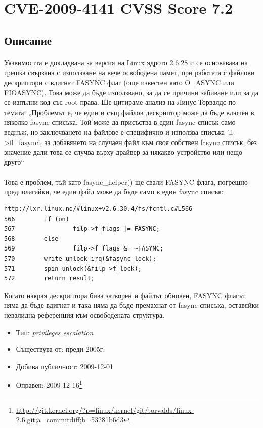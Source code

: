 \documentclass[a4paper,12pt,leqno]{article}
\begin{document}
\section{CVE-2009-4141 CVSS Score 7.2}
\subsection{Описание}
\paragraph{}
Уязвимостта е докладвана за версия на Linux ядрото 2.6.28 и се основавава на 
грешка свързана с  използване на вече освободена памет, при работата с 
файлови дескриптори с вдигнат FASYNC флаг (още известен като O\_ASYNC или 
FIOASYNC). Това може да бъде използвано, за да се причини забиване или за 
да се изпълни код със root права. Ще цитираме анализ на Линус Торвалдс по 
темата: „Проблемът е, че един и същ файлов дескриптор може да бъде 
влючен в няколко fasync списъка. Той може да присъства в един fasync списък 
само веднъж, но заключването на файлове е специфично и използва списъка 
'fl->fl\_fasync', за добавянето на случаен файл към своя собствен fasync списък, 
без значение дали това се случва върху драйвер за някакво устройство или 
нещо друго“ 
\paragraph{}
Това е проблем, тъй като fasync\_helper() ще свали FASYNC флага, погрешно 
предполагайки, че един файл може да бъде само в един fasync списък:

\begin{verbatim}
http://lxr.linux.no/#linux+v2.6.30.4/fs/fcntl.c#L566
566        if (on)
567                filp->f_flags |= FASYNC;
568        else
569                filp->f_flags &= ~FASYNC;
570        write_unlock_irq(&fasync_lock);
571        spin_unlock(&filp->f_lock);
572        return result;
\end{verbatim}
Когато накрая дескриптора бива затворен и файлът обновен, FASYNC флагът 
няма да бъде вдигнат и така няма да бъде премахнат от fasync списъка, 
оставяйки невалидна референция към освободената структура.

\begin{itemize}
    \item Тип: \textit{privileges escalation}
    \item Съществува от: преди 2005г.
  	\item Добива публичност: 2009-12-01
    \item Оправен: 2009-12-16\footnote{\url{http://git.kernel.org/?p=linux/kernel/git/torvalds/linux-2.6.git;a=commitdiff;h=53281b6d3}}
\end{itemize}
\end{document}
